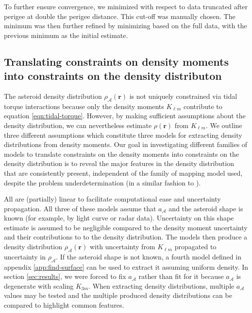 \documentclass[fleqn,usenatbib]{mnras}
\begin{document}
To further ensure convergence, we minimized with respect to data truncated after perigee at double the perigee distance. This cut-off was manually chosen. The minimum was then further refined by minimizing based on the full data, with the previous minimum as the initial estimate.


\subsection{Translating constraints on density moments into constraints on the density distributon}
\label{sec:density-distro}

The asteroid density distribution $\rho_\mathcal{A}(\bm r)$ is not uniquely constrained via tidal torque interactions because only the density moments $K_{\ell m}$ contribute to equation \ref{eqn:tidal-torque}. However, by making sufficient assumptions about the density distribution, we can nevertheless estimate $\rho(\bm r)$ from $K_{\ell m}$. We outline three different assumptions which constitute three models for extracting density distributions from density moments. 
Our goal in investigating different families of models to translate constraints on the density moments into constraints on the density distribution is to reveal the major features in the density distribution that are consistently present, independent of the family of mapping model used, despite the problem underdetermination (in a similar fashion to \cite{de2012towards}).

All are (partially) linear to facilitate computational ease and uncertainty propagation. All three of these models assume that $a_\mathcal{A}$ and the asteroid shape is known (for example, by light curve or radar data). Uncertainty on this shape estimate is assumed to be negligible compared to the density moment uncertainty and their contributions to to the density distribution. The models then produce a density distribution $\rho_\mathcal{A}(\bm r)$ with uncertainty from $K_{\ell m}$ propagated to uncertainty in $\rho_\mathcal{A}$. If the asteroid shape is not known, a fourth model defined in appendix \ref{app:find-surface} can be used to extract it assuming uniform density. In section \ref{sec:results}, we were forced to fix $a_\mathcal{A}$ rather than fit for it because $a_\mathcal{A}$ is degenerate with scaling $K_{3m}$. When extracting density distributions, multiple $a_\mathcal{A}$ values may be tested and the multiple produced density distributions can be compared to highlight common features.
\end{document}
